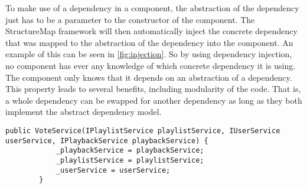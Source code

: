 To make use of a dependency in a component, the abstraction of the
dependency just has to be a parameter to the constructor of the
component. The StructureMap framework will then automatically inject
the concrete dependency that was mapped to the abstraction of the
dependency into the component. An example of this can be seen in
\cref{fig:injection}. So by using dependency injection, no component
has ever any knowledge of which concrete dependency it is using. The
component only knows that it depends on an abstraction of a
dependency. This property leads to several benefits, including
modularity of the code. That is, a whole dependency can be swapped for
another dependency as long as they both implement the abstract
dependency model.

\begin{lstlisting}[caption = {Dependency Injection through class
    constructors. IPlaylistService, IUserService and IPlaybackService
    are all abstractions of dependencies.}, label={fig:injection}]
public VoteService(IPlaylistService playlistService, IUserService userService, IPlaybackService playbackService) {
            _playbackService = playbackService;
            _playlistService = playlistService;
            _userService = userService;
        }
\end{lstlisting}
